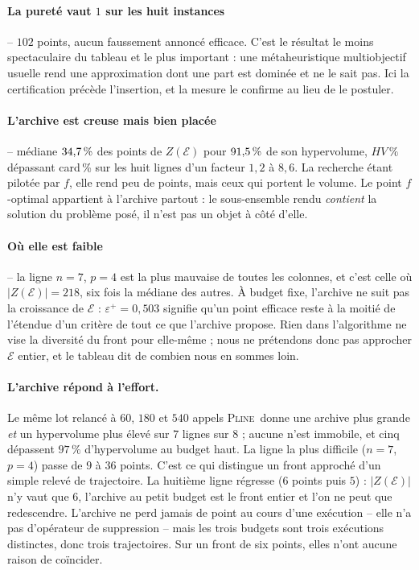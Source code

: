 \documentclass[11pt,a4paper]{article}
\theoremstyle{plain}
\theoremstyle{remark}
\newcommand{\Ecal}{\mathcal{E}}
\newcommand{\ILP}{\textsc{Pline}}
\begin{document}
\paragraph{La pureté vaut $1$ sur les huit instances}
-- $102$ points, aucun faussement annoncé efficace. C'est le résultat le
moins spectaculaire du tableau et le plus important : une métaheuristique
multiobjectif usuelle rend une approximation dont une part est dominée et ne
le sait pas. Ici la certification précède l'insertion, et la mesure le
confirme au lieu de le postuler.

\paragraph{L'archive est creuse mais bien placée}
-- médiane $34{,}7{}\,\%$ des points de $Z(\Ecal)$ pour $91{,}5{}\,\%$ de son
hypervolume, $HV\,\%$ dépassant card\,\% sur les huit lignes d'un facteur
$1{,}2$ à $8{,}6$. La recherche étant pilotée par $f$, elle rend peu de
points, mais ceux qui portent le volume. Le point $f$-optimal appartient à
l'archive partout : le sous-ensemble rendu \emph{contient} la solution du
problème posé, il n'est pas un objet à côté d'elle.

\paragraph{Où elle est faible}
-- la ligne $n=7$, $p=4$ est la plus mauvaise de toutes les colonnes, et
c'est celle où $|Z(\Ecal)|=218$, six fois la médiane des autres. À budget
fixe, l'archive ne suit pas la croissance de $\Ecal$ : $\varepsilon^+ =
0{,}503$ signifie qu'un point efficace reste à la moitié de l'étendue d'un
critère de tout ce que l'archive propose. Rien dans l'algorithme ne vise la
diversité du front pour elle-même ; nous ne prétendons donc pas approcher
$\Ecal$ entier, et le tableau dit de combien nous en sommes loin.

\paragraph{L'archive répond à l'effort.}
Le même lot relancé à $60$, $180$ et $540$ appels \ILP\ donne une archive
plus grande \emph{et} un hypervolume plus élevé sur $7$ lignes sur $8$ ;
aucune n'est immobile, et cinq dépassent $97\,\%$ d'hypervolume au budget
haut. La ligne la plus difficile ($n=7$, $p=4$) passe de $9$ à $36$ points.
C'est ce qui distingue un front approché d'un simple relevé de trajectoire.
La huitième ligne régresse ($6$ points puis $5$) : $|Z(\Ecal)|$ n'y vaut que
$6$, l'archive au petit budget est le front entier et l'on ne peut que
redescendre. L'archive ne perd jamais de point au cours d'une exécution --
elle n'a pas d'opérateur de suppression -- mais les trois budgets sont trois
exécutions distinctes, donc trois trajectoires. Sur un front de six points,
elles n'ont aucune raison de coïncider.
\end{document}
